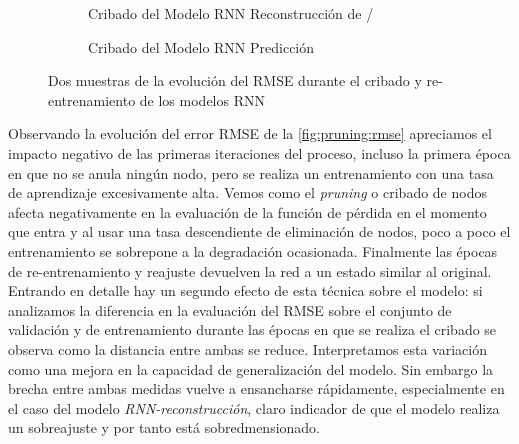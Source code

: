 \begin{figure}[!ht]
  \centering
  \begin{subfigure}[b]{0.48\textwidth}
      \centering
      \caption{\footnotesize \footnotesize \label{fig:pruning:recon}Cribado del Modelo RNN Reconstrucción de \ifell/}
  \end{subfigure}
  \hfill
  \begin{subfigure}[b]{0.48\textwidth}
      \centering
      \caption{\footnotesize \footnotesize \label{fig:pruning:predict}Cribado del Modelo RNN Predicción}
  \end{subfigure}
  \caption{\label{fig:pruning:rmse}Dos muestras de la evolución del RMSE durante el cribado y re-entrenamiento de los modelos RNN}
\end{figure}

Observando la evolución del error RMSE de la \autoref{fig:pruning:rmse} apreciamos el impacto negativo de las primeras iteraciones del proceso, incluso la primera época en que no se anula ningún nodo, pero se realiza un entrenamiento con una tasa de aprendizaje excesivamente alta. Vemos como el \textit{pruning} o cribado de nodos afecta negativamente en la evaluación de la función de pérdida en el momento que entra y al usar una tasa descendiente de eliminación de nodos, poco a poco el entrenamiento se sobrepone a la degradación ocasionada. Finalmente las épocas de re-entrenamiento y reajuste devuelven la red a un estado similar al original. Entrando en detalle hay un segundo efecto de esta técnica sobre el modelo: si analizamos la diferencia en la evaluación del RMSE sobre el conjunto de validación y de entrenamiento durante las épocas en que se realiza el cribado se observa como la distancia entre ambas se reduce. Interpretamos esta variación como una mejora en la capacidad de generalización del modelo. Sin embargo la brecha entre ambas medidas vuelve a ensancharse rápidamente, especialmente en el caso del modelo \textit{RNN-reconstrucción}, claro indicador de que el modelo realiza un sobreajuste y por tanto está sobredmensionado.


